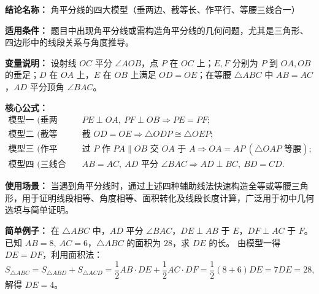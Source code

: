 \textbf{结论名称：} 角平分线的四大模型（垂两边、截等长、作平行、等腰三线合一）

\textbf{适用条件：} 题目中出现角平分线或需构造角平分线的几何问题，尤其是三角形、四边形中的线段关系与角度推导。

\textbf{变量说明：} 设射线 \(OC\) 平分 \(\angle AOB\)，点 \(P\) 在 \(OC\) 上；\(E,F\) 分别为 \(P\) 到 \(OA,OB\) 的垂足；\(D\) 在 \(OA\) 上，\(E\) 在 \(OB\) 上满足 \(OD=OE\)；在等腰 \(\triangle ABC\) 中 \(AB=AC\)，\(AD\) 平分顶角 \(\angle BAC\)。

\textbf{核心公式：}
\[
\boxed{
\begin{aligned}
\text{模型一 (垂两边):}&\quad PE\perp OA,\ PF\perp OB \Longrightarrow PE=PF;\\
\text{模型二 (截等长):}&\quad \text{截 } OD=OE \Longrightarrow \triangle ODP \cong \triangle OEP;\\
\text{模型三 (作平行):}&\quad \text{过 }P\text{ 作 }PA\parallel OB\text{ 交 }OA\text{ 于 }A \Longrightarrow OA=AP\ (\triangle OAP\text{ 等腰});\\
\text{模型四 (三线合一):}&\quad AB=AC,\ AD\text{ 平分 }\angle BAC \Longrightarrow AD\perp BC,\ BD=CD.
\end{aligned}
}
\]

\textbf{使用场景：} 当遇到角平分线时，通过上述四种辅助线法快速构造全等或等腰三角形，用于证明线段相等、角度相等、面积转化及线段长度计算，广泛用于初中几何选填与简单证明。

\textbf{简单例子：} 在 \(\triangle ABC\) 中，\(AD\) 平分 \(\angle BAC\)，\(DE\perp AB\) 于 \(E\)，\(DF\perp AC\) 于 \(F\)。已知 \(AB=8,\ AC=6\)，\(\triangle ABC\) 的面积为 \(28\)，求 \(DE\) 的长。
由模型一得 \(DE=DF\)，利用面积法：
\[
S_{\triangle ABC}=S_{\triangle ABD}+S_{\triangle ACD}=\frac12 AB\cdot DE+\frac12 AC\cdot DF=\frac12(8+6)DE=7DE=28,
\]
解得 \(DE=4\)。